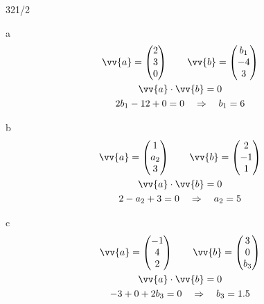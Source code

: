 \begin{exercise}{321/2}
  \item [a]
  \begin{gather*}
    \vv{a} = \begin{pmatrix}2 \\ 3 \\ 0\end{pmatrix} \qquad \vv{b} = \begin{pmatrix}b_1 \\ -4 \\ 3\end{pmatrix} \\
    \vv{a} \cdot \vv{b} = 0 \\
    2b_1 - 12 + 0 = 0 \quad\Rightarrow\quad b_1 = 6
  \end{gather*}
  \item [b]
  \begin{gather*}
    \vv{a} = \begin{pmatrix}1 \\ a_2 \\ 3\end{pmatrix} \qquad \vv{b} = \begin{pmatrix}2 \\ -1 \\ 1\end{pmatrix} \\
    \vv{a} \cdot \vv{b} = 0 \\
    2 - a_2 + 3 = 0 \quad\Rightarrow\quad a_2 = 5
  \end{gather*}
  \item [c]
  \begin{gather*}
    \vv{a} = \begin{pmatrix}-1 \\ 4 \\ 2\end{pmatrix} \qquad \vv{b} = \begin{pmatrix}3 \\ 0 \\ b_3\end{pmatrix} \\
    \vv{a} \cdot \vv{b} = 0 \\
    -3 + 0 + 2b_3 = 0 \quad\Rightarrow\quad b_3 = 1.5
  \end{gather*}
\end{exercise}
